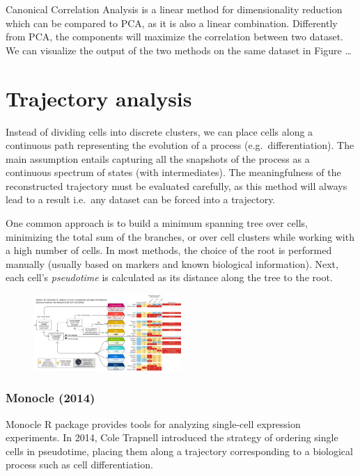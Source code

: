 Canonical Correlation Analysis is a linear method for dimensionality
reduction which can be compared to PCA, as it is also a linear
combination. Differently from PCA, the components will maximize the
correlation between two dataset. We can visualize the output of the two
methods on the same dataset in Figure \ldots{}

\hypertarget{trajectory-analysis}{%
\section{Trajectory analysis}\label{trajectory-analysis}}

Instead of dividing cells into discrete clusters, we can place cells
along a continuous path representing the evolution of a process
(e.g.~differentiation). The main assumption entails capturing all the
snapshots of the process as a continuous spectrum of states (with
intermediates). The meaningfulness of the reconstructed trajectory must
be evaluated carefully, as this method will always lead to a result
i.e.~any dataset can be forced into a trajectory.

One common approach is to build a minimum spanning tree over cells,
minimizing the total sum of the branches, or over cell clusters while
working with a high number of cells. In most methods, the choice of the
root is performed manually (usually based on markers and known
biological information). Next, each cell's \emph{pseudotime} is
calculated as its distance along the tree to the root.

\begin{figure}
\centering
\includegraphics[width=0.5\textwidth]{images/Screen_Shot_2023-02-22_at_19-10-01.png}
\caption{}
\end{figure}

\hypertarget{monocle-2014}{%
\subsubsection{Monocle (2014)}\label{monocle-2014}}

Monocle R package provides tools for analyzing single-cell expression
experiments. In 2014, Cole Trapnell introduced the strategy of ordering
single cells in pseudotime, placing them along a trajectory
corresponding to a biological process such as cell differentiation.

